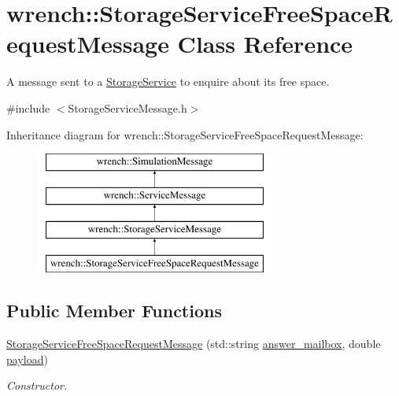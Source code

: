\hypertarget{classwrench_1_1_storage_service_free_space_request_message}{}\section{wrench\+:\+:Storage\+Service\+Free\+Space\+Request\+Message Class Reference}
\label{classwrench_1_1_storage_service_free_space_request_message}


A message sent to a \hyperlink{classwrench_1_1_storage_service}{Storage\+Service} to enquire about its free space.  




{\ttfamily \#include $<$Storage\+Service\+Message.\+h$>$}

Inheritance diagram for wrench\+:\+:Storage\+Service\+Free\+Space\+Request\+Message\+:\begin{figure}[H]
\begin{center}
\leavevmode
\includegraphics[height=4.000000cm]{classwrench_1_1_storage_service_free_space_request_message}
\end{center}
\end{figure}
\subsection*{Public Member Functions}
\begin{DoxyCompactItemize}
\item 
\hyperlink{classwrench_1_1_storage_service_free_space_request_message_a1957e84f48e23a69d833de429a908681}{Storage\+Service\+Free\+Space\+Request\+Message} (std\+::string \hyperlink{classwrench_1_1_storage_service_free_space_request_message_a111e422cad53e2b66d517633a3c0f039}{answer\+\_\+mailbox}, double \hyperlink{classwrench_1_1_simulation_message_a914f2732713f7c02898e66f05a7cb8a1}{payload})
\begin{DoxyCompactList}\small\item\em Constructor. \end{DoxyCompactList}\end{DoxyCompactItemize}
